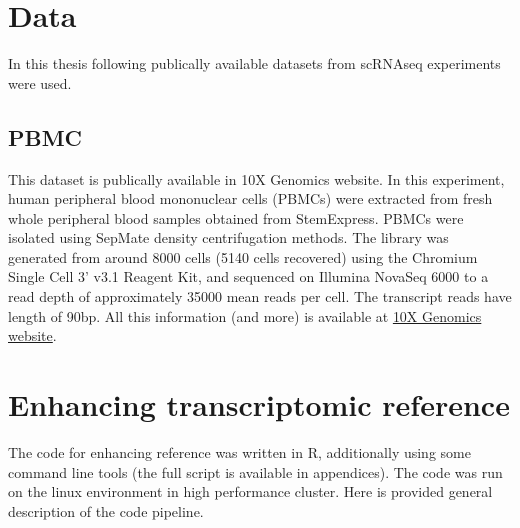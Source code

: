 \section{Data}

In this thesis following publically available datasets from scRNAseq experiments were used.

\subsection{PBMC}

This dataset is publically available in 10X Genomics website.
In this experiment, human peripheral blood mononuclear cells (PBMCs) were extracted from fresh whole peripheral blood samples obtained from StemExpress. PBMCs were isolated using SepMate density centrifugation methods.
The library was generated from around 8000 cells (5140 cells recovered) using the Chromium Single Cell 3' v3.1 Reagent Kit,
and sequenced on Illumina NovaSeq 6000 to a read depth of approximately 35000 mean reads per cell.
The transcript reads have length of 90bp.
All this information (and more) is available at
\href{https://www.10xgenomics.com/datasets/5k-human-pbmcs-3-v3-1-chromium-controller-3-1-standard}{10X Genomics website}.

\section{Enhancing transcriptomic reference}

The code for enhancing reference was written in R, additionally using some command line tools (the full script is available in appendices).
The code was run on the linux environment in high performance cluster.
Here is provided general description of the code pipeline.

